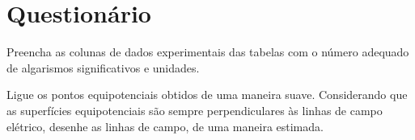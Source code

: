 \cleardoublepage


\vspace{15mm}

\begin{fullwidth}
\noindent{}
\vspace{5mm}

\noindent{}

\noindent{}

\noindent{}

\noindent{}

\noindent{}
\end{fullwidth}

\vspace{5mm}

\section{Questionário}

\begin{question}[type={exam}]{2}
Preencha as colunas de dados experimentais das tabelas com o número adequado de algarismos significativos e unidades.
\end{question}

\begin{question}[type={exam}]{3}
Ligue os pontos equipotenciais obtidos de uma maneira suave. Considerando que as superfícies equipotenciais são sempre perpendiculares às linhas de campo elétrico, desenhe as linhas de campo, de uma maneira estimada.
\end{question}

